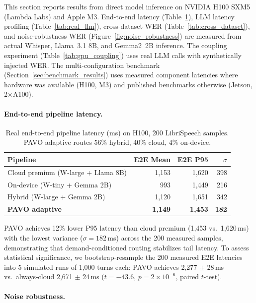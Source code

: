 \documentclass{article}
\begin{document}
This section reports results from direct model inference on NVIDIA H100 SXM5 (Lambda Labs) and Apple M3. End-to-end latency (Table~\ref{tab:e2e}), LLM latency profiling (Table~\ref{tab:real_llm}), cross-dataset WER (Table~\ref{tab:cross_dataset}), and noise-robustness WER (Figure~\ref{fig:noise_robustness}) are measured from actual Whisper, Llama~3.1 8B, and Gemma2~2B inference. The coupling experiment (Table~\ref{tab:gpu_coupling}) uses real LLM calls with synthetically injected WER. The multi-configuration benchmark (Section~\ref{sec:benchmark_results}) uses measured component latencies where hardware was available (H100, M3) and published benchmarks otherwise (Jetson, 2$\times$A100).

\paragraph{End-to-end pipeline latency.}

\begin{table}[t]
\centering
\caption{Real end-to-end pipeline latency (ms) on H100, 200 LibriSpeech samples. PAVO adaptive routes 56\% hybrid, 40\% cloud, 4\% on-device.}
\label{tab:e2e}
\small
\begin{tabular}{lrrr}
\toprule
Pipeline & E2E Mean & E2E P95 & $\sigma$ \\
\midrule
Cloud premium (W-large + Llama 8B) & 1{,}153 & 1{,}620 & 398 \\
On-device (W-tiny + Gemma 2B)      & 993    & 1{,}449 & 216 \\
Hybrid (W-large + Gemma 2B)        & 1{,}120 & 1{,}651 & 342 \\
\textbf{PAVO adaptive}             & \textbf{1{,}149} & \textbf{1{,}453} & \textbf{182} \\
\bottomrule
\end{tabular}
\end{table}

PAVO achieves 12\% lower P95 latency than cloud premium (1{,}453 vs.\ 1{,}620\,ms) with the lowest variance ($\sigma=182$\,ms) across the 200 measured samples, demonstrating that demand-conditioned routing stabilizes tail latency. To assess statistical significance, we bootstrap-resample the 200 measured E2E latencies into 5 simulated runs of 1{,}000 turns each: PAVO achieves 2{,}277 $\pm$ 28\,ms vs.\ always-cloud 2{,}671 $\pm$ 24\,ms ($t = -43.6$, $p = 2\times10^{-6}$, paired $t$-test).

\paragraph{Noise robustness.}
\end{document}
